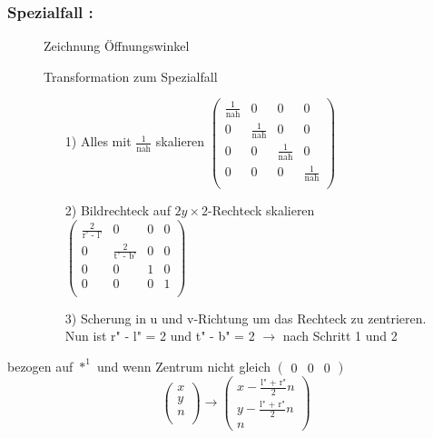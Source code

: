 \documentclass[11pt]{article}
\begin{document}
\subsubsection{Spezialfall :}
\begin{figure}[!hb]
\begin{minipage}[l]{4cm}
{\color{red} Zeichnung Öffnungswinkel}
\end{minipage}
\hfill
\begin{minipage}[c]{6.5cm}
Transformation zum Spezialfall
\begin{enumerate}
\item[1)] Alles mit $\frac{1}{\text{nah}}$ skalieren 
$\begin{pmatrix}
\frac{1}{\text{nah}} & 0 & 0 & 0 \\
0 & \frac{1}{\text{nah}} & 0 & 0 \\
0 & 0 & \frac{1}{\text{nah}} & 0 \\
0 & 0 & 0 & \frac{1}{\text{nah}} \\
\end{pmatrix}$
\item[2)] Bildrechteck auf $2y\times 2$-Rechteck skalieren
$\begin{pmatrix}
\frac{2}{\text{r' - l'}} & 0 & 0 & 0 \\
0 & \frac{2}{\text{t' - b'}} & 0 & 0 \\
0 & 0 & 1 & 0 \\
0 & 0 & 0 & 1 \\
\end{pmatrix}$
\item[3)] Scherung in u und v-Richtung um das Rechteck zu zentrieren. Nun ist r" - l" = 2 und t" - b" = 2 $\rightarrow$ nach Schritt 1 und 2 \\
\end{enumerate}
\end{minipage}
\end{figure}
bezogen auf $*^1$ und wenn Zentrum nicht gleich $\begin{pmatrix}
0 & 0 & 0 
\end{pmatrix}$
$$ \begin{pmatrix}
x \\ y \\ n \\ 
\end{pmatrix}
\rightarrow
\begin{pmatrix}
x - \frac{\text{l" + r"}}{2}n \\
y - \frac{\text{l" + r"}}{2}n \\
n
\end{pmatrix}$$
\end{document}
